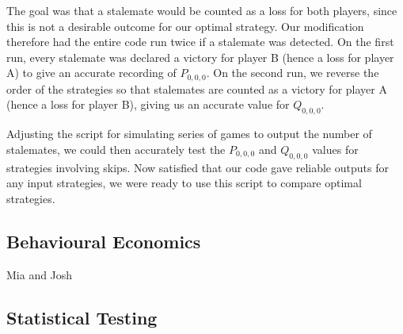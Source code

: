 \documentclass[a4paper,titlepage]{article}
\begin{document}
The goal was that a stalemate would be counted as a loss for both players, since this is not a desirable outcome for our optimal strategy. Our modification therefore had the entire code run twice if a stalemate was detected. On the first run, every stalemate was declared a victory for player B (hence a loss for player A) to give an accurate recording of $P_{0,0,0}$. On the second run, we reverse the order of the strategies so that stalemates are counted as a victory for player A (hence a loss for player B), giving us an accurate value for $Q_{0,0,0}$.

Adjusting the script for simulating series of games to output the number of stalemates, we could then accurately test the $P_{0,0,0}$ and $Q_{0,0,0}$ values for strategies involving skips. Now satisfied that our code gave reliable outputs for any input strategies, we were ready to use this script to compare optimal strategies.

\subsection{Behavioural Economics}
Mia and Josh

\subsection{Statistical Testing}
\end{document}
